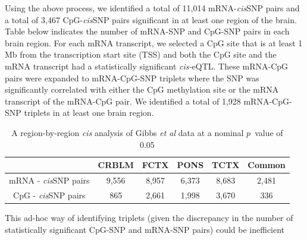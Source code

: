 \documentclass[hidelinks]{article}
\begin{document}
Using the above process, we identified a total of 11,014 mRNA-\emph{cis}SNP pairs and a total of 3,467 CpG-\emph{cis}SNP pairs significant in at least one region of the brain. Table below indicates the number of mRNA-SNP and CpG-SNP pairs in each brain region. For each mRNA transcript, we selected a CpG site that is at least 1 Mb from the transcription start site (TSS) and both the CpG site and the mRNA transcript had a statistically significant \emph{cis-}eQTL. These mRNA-CpG pairs were expanded to mRNA-CpG-SNP triplets where the SNP was significantly correlated with either the CpG methylation site or the mRNA transcript of the mRNA-CpG pair. We identified a total of 1,928 mRNA-CpG-SNP triplets in at least one brain region. 

\begin{table}[!ht]
\begin{center}
\begin{tabular}{| c | c | c | c | c | c |}
\hline
& CRBLM & FCTX & PONS & TCTX & Common\\ \hline \hline
mRNA - \emph{cis}SNP pairs & 9,556 & 8,957 & 6,373 & 8,683 & 2,481 \\ \hline
CpG - \emph{cis}SNP pairs & 865 & 2,661 & 1,998 & 3,670 & 336 \\
\hline\hline
\end{tabular}
\end{center}
\caption{A region-by-region \emph{cis} analysis of Gibbs \emph{et al} data at a nominal $p$~value of 0.05}
\end{table}

This ad-hoc way of identifying triplets (given the discrepancy in the number of statistically significant CpG-SNP and mRNA-SNP pairs) could be inefficient 


%
\end{document}
